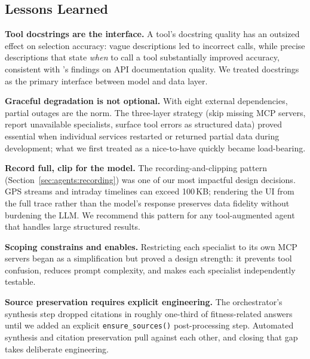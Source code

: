 \subsection{Lessons Learned}\label{sec:discussion:lessons}

\textbf{Tool docstrings are the interface.} A tool's docstring quality has an outsized effect on selection accuracy: vague descriptions led to incorrect calls, while precise descriptions that state \textit{when} to call a tool substantially improved accuracy, consistent with \cite{patil_gorilla_2023}'s findings on API documentation quality. We treated docstrings as the primary interface between model and data layer.

\textbf{Graceful degradation is not optional.} With eight external dependencies, partial outages are the norm. The three-layer strategy (skip missing MCP servers, report unavailable specialists, surface tool errors as structured data) proved essential when individual services restarted or returned partial data during development; what we first treated as a nice-to-have quickly became load-bearing.

\textbf{Record full, clip for the model.} The recording-and-clipping pattern (Section~\ref{sec:agents:recording}) was one of our most impactful design decisions. GPS streams and intraday timelines can exceed 100\,KB; rendering the UI from the full trace rather than the model's response preserves data fidelity without burdening the LLM. We recommend this pattern for any tool-augmented agent that handles large structured results.

\textbf{Scoping constrains and enables.} Restricting each specialist to its own MCP servers began as a simplification but proved a design strength: it prevents tool confusion, reduces prompt complexity, and makes each specialist independently testable.

\textbf{Source preservation requires explicit engineering.} The orchestrator's synthesis step dropped citations in roughly one-third of fitness-related answers until we added an explicit \texttt{ensure\_sources()} post-processing step. Automated synthesis and citation preservation pull against each other, and closing that gap takes deliberate engineering.
